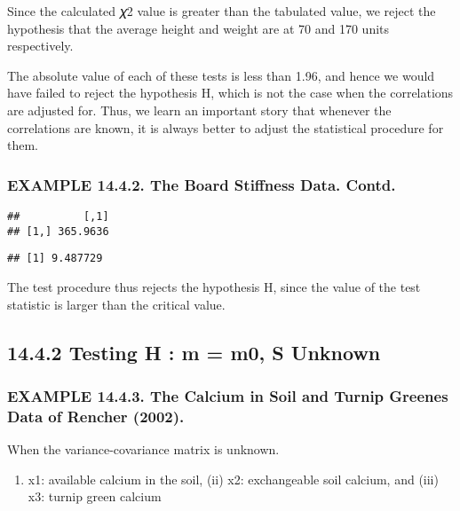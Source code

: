 \documentclass[]{article}
\providecommand{\tightlist}{%
  \setlength{\itemsep}{0pt}\setlength{\parskip}{0pt}}
\begin{document}
Since the calculated 𝜒2 value is greater than the tabulated value, we
reject the hypothesis that the average height and weight are at 70 and
170 units respectively.

The absolute value of each of these tests is less than 1.96, and hence
we would have failed to reject the hypothesis H, which is not the case
when the correlations are adjusted for. Thus, we learn an important
story that whenever the correlations are known, it is always better to
adjust the statistical procedure for them.

\hypertarget{example-14.4.2.-the-board-stiffness-data.-contd.}{%
\subsubsection{EXAMPLE 14.4.2. The Board Stiffness Data.
Contd.}\label{example-14.4.2.-the-board-stiffness-data.-contd.}}

\begin{verbatim}
##          [,1]
## [1,] 365.9636
\end{verbatim}

\begin{verbatim}
## [1] 9.487729
\end{verbatim}

The test procedure thus rejects the hypothesis H, since the value of the
test statistic is larger than the critical value.

\hypertarget{testing-h-m-m0-s-unknown}{%
\subsection{14.4.2 Testing H : m = m0, S
Unknown}\label{testing-h-m-m0-s-unknown}}

\hypertarget{example-14.4.3.-the-calcium-in-soil-and-turnip-greenes-data-of-rencher-2002.}{%
\subsubsection{EXAMPLE 14.4.3. The Calcium in Soil and Turnip Greenes
Data of Rencher
(2002).}\label{example-14.4.3.-the-calcium-in-soil-and-turnip-greenes-data-of-rencher-2002.}}

When the variance-covariance matrix is unknown.

\begin{enumerate}
\def\labelenumi{(\roman{enumi})}
\tightlist
\item
  x1: available calcium in the soil, (ii) x2: exchangeable soil calcium,
  and (iii) x3: turnip green calcium
\end{enumerate}
\end{document}
